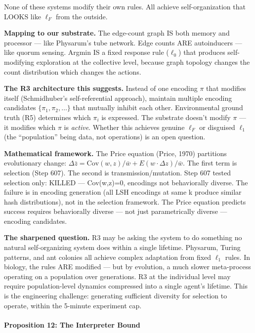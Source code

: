 \documentclass[
  11pt,
]{article}
\begin{document}
None of these systems modify their own rules. All achieve
self-organization that LOOKS like \(\ell_F\) from the outside.

\textbf{Mapping to our substrate.} The edge-count graph IS both memory
and processor --- like Physarum's tube network. Edge counts ARE
autoinducers --- like quorum sensing. Argmin IS a fixed response rule
(\(\ell_0\)) that produces self-modifying exploration at the collective
level, because graph topology changes the count distribution which
changes the actions.

\textbf{The R3 architecture this suggests.} Instead of one encoding
\(\pi\) that modifies itself (Schmidhuber's self-referential approach),
maintain multiple encoding candidates \(\{\pi_1, \pi_2, \ldots\}\) that
mutually inhibit each other. Environmental ground truth (R5) determines
which \(\pi_i\) is expressed. The substrate doesn't modify \(\pi\) ---
it modifies which \(\pi\) is \emph{active}. Whether this achieves
genuine \(\ell_F\) or disguised \(\ell_1\) (the ``population'' being
data, not operations) is an open question.

\textbf{Mathematical framework.} The Price equation (Price, 1970)
partitions evolutionary change:
\(\Delta\bar{z} = \text{Cov}(w, z)/\bar{w} + E(w \cdot \Delta z)/\bar{w}\).
The first term is selection (Step 607). The second is
transmission/mutation. Step 607 tested selection only: KILLED ---
Cov(w,z)=0, encodings not behaviorally diverse. The failure is in
encoding generation (all LSH encodings at same k produce similar hash
distributions), not in the selection framework. The Price equation
predicts success requires behaviorally diverse --- not just
parametrically diverse --- encoding candidates.

\textbf{The sharpened question.} R3 may be asking the system to do
something no natural self-organizing system does within a single
lifetime. Physarum, Turing patterns, and ant colonies all achieve
complex adaptation from fixed \(\ell_1\) rules. In biology, the rules
ARE modified --- but by evolution, a much slower meta-process operating
on a population over generations. R3 at the individual level may require
population-level dynamics compressed into a single agent's lifetime.
This is the engineering challenge: generating sufficient diversity for
selection to operate, within the 5-minute experiment cap.

\paragraph{Proposition 12: The Interpreter
Bound}\label{proposition-12-the-interpreter-bound}
\end{document}
